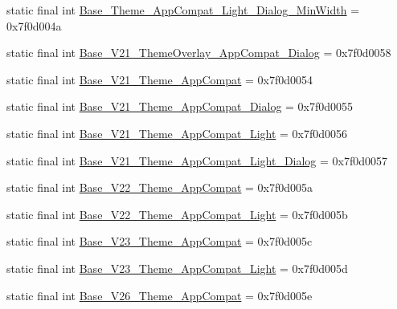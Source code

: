 \begin{DoxyCompactItemize}
static final int \mbox{\hyperlink{classandroid_1_1support_1_1v7_1_1appcompat_1_1_r_1_1style_add0b859f850814a0f0994f7da25148df}{Base\+\_\+\+Theme\+\_\+\+App\+Compat\+\_\+\+Light\+\_\+\+Dialog\+\_\+\+Min\+Width}} = 0x7f0d004a
\item 
static final int \mbox{\hyperlink{classandroid_1_1support_1_1v7_1_1appcompat_1_1_r_1_1style_ac44aa9e49ece31bada22eeac8667d8ea}{Base\+\_\+\+V21\+\_\+\+Theme\+Overlay\+\_\+\+App\+Compat\+\_\+\+Dialog}} = 0x7f0d0058
\item 
static final int \mbox{\hyperlink{classandroid_1_1support_1_1v7_1_1appcompat_1_1_r_1_1style_a8cb8846ccd9a78ed3b5c7cfff9c64b53}{Base\+\_\+\+V21\+\_\+\+Theme\+\_\+\+App\+Compat}} = 0x7f0d0054
\item 
static final int \mbox{\hyperlink{classandroid_1_1support_1_1v7_1_1appcompat_1_1_r_1_1style_af12a4babdfe3ab610b0d241598adcf1d}{Base\+\_\+\+V21\+\_\+\+Theme\+\_\+\+App\+Compat\+\_\+\+Dialog}} = 0x7f0d0055
\item 
static final int \mbox{\hyperlink{classandroid_1_1support_1_1v7_1_1appcompat_1_1_r_1_1style_a4376f811c6c223511a27dd5c2729e9e0}{Base\+\_\+\+V21\+\_\+\+Theme\+\_\+\+App\+Compat\+\_\+\+Light}} = 0x7f0d0056
\item 
static final int \mbox{\hyperlink{classandroid_1_1support_1_1v7_1_1appcompat_1_1_r_1_1style_aeb190b7df390f0ef6a3f546f6218e70c}{Base\+\_\+\+V21\+\_\+\+Theme\+\_\+\+App\+Compat\+\_\+\+Light\+\_\+\+Dialog}} = 0x7f0d0057
\item 
static final int \mbox{\hyperlink{classandroid_1_1support_1_1v7_1_1appcompat_1_1_r_1_1style_a7e00a5c99ed370c04f91b6082c20eab7}{Base\+\_\+\+V22\+\_\+\+Theme\+\_\+\+App\+Compat}} = 0x7f0d005a
\item 
static final int \mbox{\hyperlink{classandroid_1_1support_1_1v7_1_1appcompat_1_1_r_1_1style_a26869f46923cbd24e2e79aaef1c05467}{Base\+\_\+\+V22\+\_\+\+Theme\+\_\+\+App\+Compat\+\_\+\+Light}} = 0x7f0d005b
\item 
static final int \mbox{\hyperlink{classandroid_1_1support_1_1v7_1_1appcompat_1_1_r_1_1style_aeb390174348a40b9d377b252a7727d39}{Base\+\_\+\+V23\+\_\+\+Theme\+\_\+\+App\+Compat}} = 0x7f0d005c
\item 
static final int \mbox{\hyperlink{classandroid_1_1support_1_1v7_1_1appcompat_1_1_r_1_1style_a7d90475931148b5ca67b10d2fdc370b5}{Base\+\_\+\+V23\+\_\+\+Theme\+\_\+\+App\+Compat\+\_\+\+Light}} = 0x7f0d005d
\item 
static final int \mbox{\hyperlink{classandroid_1_1support_1_1v7_1_1appcompat_1_1_r_1_1style_a0b6cbb8d8f09faf5399f19ea7ea981ad}{Base\+\_\+\+V26\+\_\+\+Theme\+\_\+\+App\+Compat}} = 0x7f0d005e

\end{DoxyCompactItemize}
